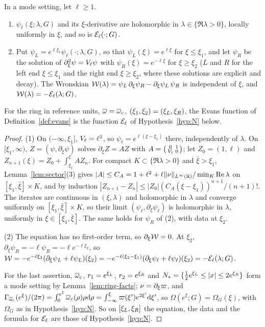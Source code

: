 \begin{lemma}
\label{lem:evans-basic}
In a mode setting, let $\ell\ge1$.
\begin{enumerate}[label=\textup{(\arabic*)}]
\item $\psi_\ell(\xi;\lambda,G)$ and its $\xi$-derivative are holomorphic in
  $\lambda\in\{\Re\lambda>0\}$, locally uniformly in $\xi$, and so is
  $\mathcal{E}_\ell(\cdot;G)$.
\item Put $\psi_L=e^{\ell\xi_1}\psi_\ell(\cdot;\lambda,G)$, so that
  $\psi_L(\xi)=e^{\ell\xi}$ for $\xi\le\xi_1$, and let $\psi_R$ be the solution of
  $\partial_\xi^2\psi=V_\ell\psi$ with $\psi_R(\xi)=e^{-\ell\xi}$ for $\xi\ge\xi_2$
  \textup{(}$L$ and $R$ for the left end $\xi\le\xi_1$ and the right end
  $\xi\ge\xi_2$, where these solutions are explicit and decay\textup{)}. The
  Wronskian $\mathcal{W}(\lambda)=\psi_L\,\partial_\xi\psi_R-\partial_\xi\psi_L\,\psi_R$ is independent of $\xi$,
  and $\mathcal{W}(\lambda)=-\mathcal{E}_\ell(\lambda;G)$.
\end{enumerate}
For the ring in reference units, $\overline{\omega}=\overline{\omega}_{\mathrm{c}}$, $(\xi_1,\xi_2)=(\xi_L,\xi_R)$,
the Evans function of Definition~\ref{def:evans} is the function $\mathcal{E}_\ell$ of
Hypothesis~\ref{hyp:N} below.
\end{lemma}
\begin{proof}
(1) On $(-\infty,\xi_1]$, $V_\ell=\ell^2$, so $\psi_\ell=e^{\ell(\xi-\xi_1)}$
there, independently of $\lambda$. On $[\xi_1,\infty)$, $Z=(\psi,\partial_\xi\psi)$
solves $\partial_\xi Z=AZ$ with
$A=\begin{psmallmatrix}0&1\\ V_\ell&0\end{psmallmatrix}$; let
$Z_0=(1,\ell)$ and $Z_{n+1}(\xi)=Z_0+\int_{\xi_1}^\xi AZ_n$. For compact
$K\subset\{\Re\lambda>0\}$ and $\bar\xi>\xi_1$, Lemma~\ref{lem:sector}(3) gives $|A|\le
C_A=1+\ell^2+\ell\|\nu\|_{L^\infty(\mathbb{R})}/\min_K\Re\lambda$ on $[\xi_1,\bar\xi]\times K$, and by
induction
$|Z_{n+1}-Z_n|\le|Z_0|(C_A(\xi-\xi_1))^{n+1}/(n+1)!$. The
iterates are continuous in $(\xi,\lambda)$ and holomorphic in $\lambda$ and converge
uniformly on $[\xi_1,\bar\xi]\times K$, so their limit $(\psi_\ell,\partial_\xi\psi_\ell)$ is
holomorphic in $\lambda$, uniformly in $\xi\in[\xi_1,\bar\xi]$. The same holds for $\psi_R$ of (2), with
data at $\xi_2$.

(2) The equation has no first-order term, so $\partial_\xi\mathcal{W}=0$. At $\xi_2$,
$\partial_\xi\psi_R=-\ell\psi_R=-\ell e^{-\ell\xi_2}$, so
$\mathcal{W}=-e^{-\ell\xi_2}(\partial_\xi\psi_L+\ell\psi_L)(\xi_2)
=-e^{-\ell(\xi_2-\xi_1)}(\partial_\xi\psi_\ell+\ell\psi_\ell)(\xi_2)=-\mathcal{E}_\ell(\lambda;G)$.

For the last assertion, $\overline{\omega}_{\mathrm{c}}$, $r_1=e^{\xi_L}$, $r_2=e^{\xi_R}$ and
$N_*=\{\frac12e^{\xi_L}\le|x|\le2e^{\xi_R}\}$ form a mode setting by
Lemma~\ref{lem:ring-facts}; $\nu=\partial_\xi\varpi$, and
$\Gamma_{\overline{\omega}_{\mathrm{c}}}(e^\xi)/(2\pi)=\int_0^{e^\xi}\overline{\omega}_{\mathrm{c}}(\rho)\rho\dd\rho
=\int_{-\infty}^\xi\varpi(\xi')e^{2\xi'}\dd\xi'$, so $\Omega(e^\xi;G)=\Omega_G(\xi)$, with
$\Omega_G$ as in Hypothesis~\ref{hyp:N}.
So on $[\xi_L,\xi_R]$ the equation, the data and the formula for $\mathcal{E}_\ell$ are
those of Hypothesis~\ref{hyp:N}.
\end{proof}


